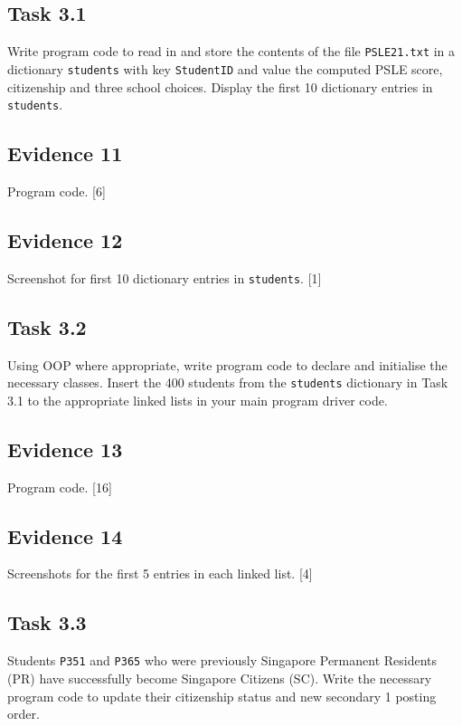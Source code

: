 \subsection*{Task 3.1 }

Write program code to read in and store the contents of the file \texttt{PSLE21.txt}
in a dictionary \texttt{students} with key \texttt{StudentID} and
value the computed PSLE score, citizenship and three school choices.
Display the first 10 dictionary entries in \texttt{students}. 

\subsection*{Evidence 11}

Program code. \hfill{}{[}6{]}

\subsection*{Evidence 12 }

Screenshot for first 10 dictionary entries in \texttt{students}.\hfill{}
{[}1{]}

\subsection*{Task 3.2 }

Using OOP where appropriate, write program code to declare and initialise
the necessary classes. Insert the 400 students from the \texttt{students}
dictionary in Task 3.1 to the appropriate linked lists in your main
program driver code. 

\subsection*{Evidence 13 }

Program code. \hfill{}{[}16{]}

\subsection*{Evidence 14 }

Screenshots for the first 5 entries in each linked list. \hfill{}{[}4{]}

\subsection*{Task 3.3 }

Students \texttt{P351} and \texttt{P365} who were previously Singapore
Permanent Residents (PR) have successfully become Singapore Citizens
(SC). Write the necessary program code to update their citizenship
status and new secondary 1 posting order. 

